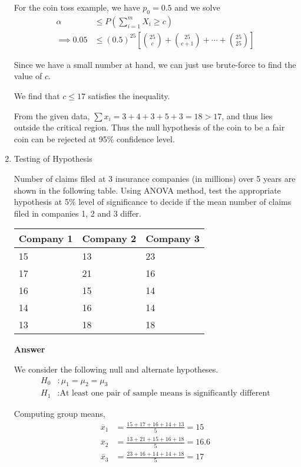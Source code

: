 \documentclass[12pt, oneside]{article}
\begin{document}
\begin{enumerate}
{    For the coin toss example, we have \(p_0 = 0.5\) and we solve
    \begin{align*}
        \alpha &\leq P\left(\sum_{i=1}^{m} X_i \geq c\right) \\
        \implies 0.05 &\leq (0.5)^{25} \left[ {25 \choose c} + {25 \choose {c + 1}} + \cdots + {25 \choose 25} \right]
    \end{align*}

    Since we have a small number at hand, we can just use brute-force to find the value of \(c\).

    We find that \(c \leq 17\) satisfies the inequality.

    From the given data, \(\sum x_i = 3 + 4 + 3 + 5 + 3 = 18 > 17\), and thus lies outside
    the critical region. Thus the null hypothesis of the coin to be a fair coin can
    be rejected at 95\% confidence level.
}


\item {
    Testing of Hypothesis

    Number of claims filed at 3 insurance companies (in millions) over 5 years are 
    shown in the following table.
    Using ANOVA method, test the appropriate hypothesis at 5\% level of significance
    to decide if the mean number of claims filed in companies 1, 2 and 3 differ.

    \begin{center}
    \begin{tabularx}{0.6\linewidth}{|X|X|X|}
        \hline
        Company 1 & Company 2 & Company 3 \\
        \hline
        15 & 13 & 23 \\
        17 & 21 & 16 \\
        16 & 15 & 14 \\
        14 & 16 & 14 \\
        13 & 18 & 18 \\
        \hline
    \end{tabularx}
    \end{center}

    \textbf{Answer}

    We consider the following null and alternate hypotheses.
    \begin{align*}
        H_0 &: \mu_1 = \mu_2 = \mu_3 \\
        H_1 &: \text{At least one pair of sample means is significantly different}
    \end{align*}

    Computing group means,
    \begin{align*}
        \overline{x}_1 &= \frac{15 + 17 + 16 + 14 + 13}{5} = 15 \\
        \overline{x}_2 &= \frac{13 + 21 + 15 + 16 + 18}{5} = 16.6 \\
        \overline{x}_3 &= \frac{23 + 16 + 14 + 14 + 18}{5} = 17
    \end{align*}

}
\end{enumerate}
\end{document}
